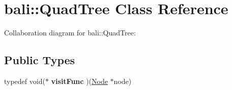 \hypertarget{classbali_1_1_quad_tree}{\section{bali\-:\-:Quad\-Tree Class Reference}
\label{classbali_1_1_quad_tree}
}


Collaboration diagram for bali\-:\-:Quad\-Tree\-:
\subsection*{Public Types}
\begin{DoxyCompactItemize}
\item 
\hypertarget{classbali_1_1_quad_tree_a64282c1910507d5d41b93769a557ce0d}{typedef void($\ast$ {\bfseries visit\-Func} )(\hyperlink{classbali_1_1_node}{Node} $\ast$node)}\label{classbali_1_1_quad_tree_a64282c1910507d5d41b93769a557ce0d}

\end{DoxyCompactItemize}
